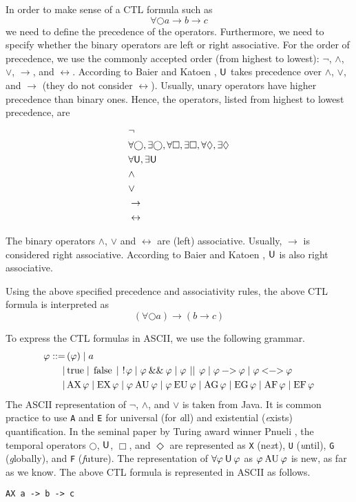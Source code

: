 \documentclass[12pt]{article}
\newcommand{\always}{\Box}
\newcommand{\eventually}{\Diamond}
\newcommand{\nxt}{\bigcirc}
\newcommand{\until}{\mathbin{\sf U}}
\newcommand{\TRUE}{\mbox{\lstinline{true}}}
\newcommand{\FALSE}{\mbox{\lstinline{false}}}
\newcommand{\NOT}{\mbox{\lstinline{!}}}
\newcommand{\AND}{\mathbin{\mbox{\lstinline{\&\&}}}}
\newcommand{\OR}{\mathbin{\mbox{\lstinline{||}}}}
\newcommand{\IMPLIES}{\mathbin{\mbox{\lstinline{->}}}}
\newcommand{\IFF}{\mathbin{\mbox{\lstinline{<->}}}}
\newcommand{\AX}{\mbox{\lstinline{AX}\,}}
\newcommand{\EX}{\mbox{\lstinline{EX}\,}}
\newcommand{\AG}{\mbox{\lstinline{AG}\,}}
\newcommand{\EG}{\mbox{\lstinline{EG}\,}}
\newcommand{\AF}{\mbox{\lstinline{AF}\,}}
\newcommand{\EF}{\mbox{\lstinline{EF}\,}}
\newcommand{\AU}{\mathbin{\mbox{\lstinline{AU}}}}
\newcommand{\EU}{\mathbin{\mbox{\lstinline{EU}}}}
\theoremstyle{definition}
\begin{document}
In order to make sense of a CTL formula such as
\[
\forall \nxt a \rightarrow b \rightarrow c
\]
we need to define the precedence of the operators.  Furthermore, we need to specify whether the binary operators are left or right associative.  For the order of precedence, we use the commonly accepted order (from highest to lowest): $\neg$, $\wedge$, $\vee$, $\rightarrow$, and $\leftrightarrow$.  According to Baier and Katoen \cite{BK08}, $\until$ takes precedence over $\wedge$, $\vee$, and $\rightarrow$ (they do not consider $\leftrightarrow$).  Usually, unary operators have higher precedence than binary ones.  Hence, the operators, listed from highest to lowest precedence, are
\begin{align*}
& \neg\\
& \forall \nxt, \exists \nxt, \forall \always, \exists \always, \forall \eventually, \exists \eventually\\
& \forall \until, \exists \until\\
& \wedge\\
& \vee\\
& \rightarrow\\
& \leftrightarrow
\end{align*}

The binary operators $\wedge$, $\vee$ and $\leftrightarrow$ are (left) associative.  Usually, $\rightarrow$ is considered right associative.  According to Baier and Katoen \cite{BK08}, $\until$ is also right associative.

Using the above specified precedence and associativity rules, the above CTL formula is interpreted as
\[
(\forall \nxt a) \rightarrow (b \rightarrow c)
\]

To express the CTL formulas in ASCII, we use the following grammar.
\begin{align*}
\varphi
::= \, & ( \varphi ) 
\mid a\\
\mid\, & \TRUE
\mid \FALSE
\mid \NOT \varphi
\mid \varphi \AND \varphi
\mid \varphi \OR \varphi
\mid \varphi \IMPLIES \varphi
\mid \varphi \IFF \varphi\\
\mid \, & \AX \varphi
\mid \EX \varphi
\mid  \varphi \AU \varphi
\mid \varphi \EU \varphi
\mid \AG \varphi
\mid \EG \varphi
\mid \AF \varphi
\mid \EF \varphi
\end{align*}
The ASCII representation of $\neg$, $\wedge$, and $\vee$ is taken from Java.  It is common practice to use \lstinline{A} and \lstinline{E} for universal (for \emph{a}ll) and existential (\emph{e}xists) quantification.  In the seminal paper by Turing award winner Pnueli \cite{P77}, the temporal operators $\nxt$, $\until$, $\always$, and $\eventually$ are represented as \lstinline{X} (ne\emph{x}t), \lstinline{U} (\emph{u}ntil), \lstinline{G} (\emph{g}lobally), and \lstinline{F} (\emph{f}uture).  The representation of $\forall \varphi \until \varphi$ as $\varphi \AU \varphi$ is new, as far as we know.  The above CTL formula is represented in ASCII as follows.
\begin{center}
\lstinline{AX a -> b -> c}
\end{center}
\end{document}
